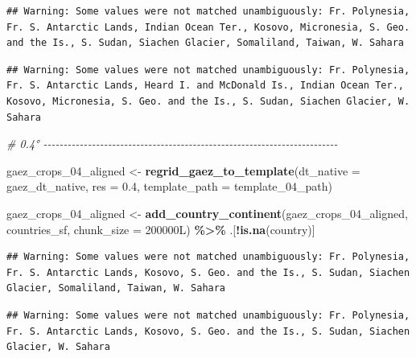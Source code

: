 \documentclass[
  11pt,
]{article}
\newenvironment{Shaded}{\begin{snugshade}}{\end{snugshade}}
\newcommand{\AttributeTok}[1]{\textcolor[rgb]{0.13,0.29,0.53}{#1}}
\newcommand{\CommentTok}[1]{\textcolor[rgb]{0.56,0.35,0.01}{\textit{#1}}}
\newcommand{\DataTypeTok}[1]{\textcolor[rgb]{0.13,0.29,0.53}{#1}}
\newcommand{\DecValTok}[1]{\textcolor[rgb]{0.00,0.00,0.81}{#1}}
\newcommand{\FloatTok}[1]{\textcolor[rgb]{0.00,0.00,0.81}{#1}}
\newcommand{\FunctionTok}[1]{\textcolor[rgb]{0.13,0.29,0.53}{\textbf{#1}}}
\newcommand{\NormalTok}[1]{#1}
\newcommand{\OtherTok}[1]{\textcolor[rgb]{0.56,0.35,0.01}{#1}}
\newcommand{\SpecialCharTok}[1]{\textcolor[rgb]{0.81,0.36,0.00}{\textbf{#1}}}
\begin{document}
\begin{verbatim}
## Warning: Some values were not matched unambiguously: Fr. Polynesia, Fr. S. Antarctic Lands, Indian Ocean Ter., Kosovo, Micronesia, S. Geo. and the Is., S. Sudan, Siachen Glacier, Somaliland, Taiwan, W. Sahara
\end{verbatim}

\begin{verbatim}
## Warning: Some values were not matched unambiguously: Fr. Polynesia, Fr. S. Antarctic Lands, Heard I. and McDonald Is., Indian Ocean Ter., Kosovo, Micronesia, S. Geo. and the Is., S. Sudan, Siachen Glacier, W. Sahara
\end{verbatim}

\begin{Shaded}
\begin{Highlighting}[]
\CommentTok{\# 0.4° {-}{-}{-}{-}{-}{-}{-}{-}{-}{-}{-}{-}{-}{-}{-}{-}{-}{-}{-}{-}{-}{-}{-}{-}{-}{-}{-}{-}{-}{-}{-}{-}{-}{-}{-}{-}{-}{-}{-}{-}{-}{-}{-}{-}{-}{-}{-}{-}{-}{-}{-}{-}{-}{-}{-}{-}{-}{-}{-}{-}{-}{-}{-}{-}{-}{-}{-}{-}{-}{-}{-}{-}{-}}

\NormalTok{gaez\_crops\_04\_aligned }\OtherTok{\textless{}{-}} \FunctionTok{regrid\_gaez\_to\_template}\NormalTok{(}\AttributeTok{dt\_native =}\NormalTok{ gaez\_dt\_native,}
                                                 \AttributeTok{res =} \FloatTok{0.4}\NormalTok{,}
                                                 \AttributeTok{template\_path =}\NormalTok{ template\_04\_path)}

\NormalTok{gaez\_crops\_04\_aligned }\OtherTok{\textless{}{-}} \FunctionTok{add\_country\_continent}\NormalTok{(gaez\_crops\_04\_aligned, countries\_sf,}
                                               \AttributeTok{chunk\_size =} \DecValTok{200000}\DataTypeTok{L}\NormalTok{) }\SpecialCharTok{\%\textgreater{}\%}
\NormalTok{  .[}\SpecialCharTok{!}\FunctionTok{is.na}\NormalTok{(country)]}
\end{Highlighting}
\end{Shaded}

\begin{verbatim}
## Warning: Some values were not matched unambiguously: Fr. Polynesia, Fr. S. Antarctic Lands, Kosovo, S. Geo. and the Is., S. Sudan, Siachen Glacier, Somaliland, Taiwan, W. Sahara
\end{verbatim}

\begin{verbatim}
## Warning: Some values were not matched unambiguously: Fr. Polynesia, Fr. S. Antarctic Lands, Kosovo, S. Geo. and the Is., S. Sudan, Siachen Glacier, W. Sahara
\end{verbatim}
\end{document}
